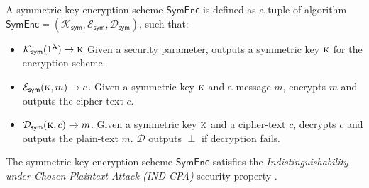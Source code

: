 	


\begin{definition}
	\label{def:Symmetric-key encryption}
	A symmetric-key encryption scheme  $\mathsf{SymEnc}$ is defined as a tuple of algorithm \(\mathsf{SymEnc}=(\mathcal{K}_\mathsf{sym}, \mathcal{E}_\mathsf{sym}, \mathcal{D}_\mathsf{sym})\), such that:
	
	\begin{itemize}
		\item \(\mathcal{K}_\mathsf{sym}(1^{\boldsymbol{\lambda}}) \rightarrow \textsc{k}\) Given a security parameter, outputs a symmetric key \(\textsc{k}\) for the encryption scheme.
		\item \(\mathcal{E}_\mathsf{sym}(\textsc{k}, m) \rightarrow c\). Given a symmetric key \(\textsc{k}\) and a message \(m\), encrypts \(m\) and outputs the cipher-text \(c\).
		\item \(\mathcal{D}_\mathsf{sym}(\textsc{k}, c) \rightarrow m\). Given a symmetric key \(\textsc{k}\) and a cipher-text \(c\), decrypts \(c\) and outputs the plain-text \(m\). \(\mathcal{D}\) outputs \(\perp\) if decryption fails.
	\end{itemize}
	The symmetric-key encryption scheme \(\mathsf{SymEnc}\) satisfies the \textit{Indistinguishability under Chosen Plaintext Attack (IND-CPA)} security property \cite{katz2020introduction}.
\end{definition}




